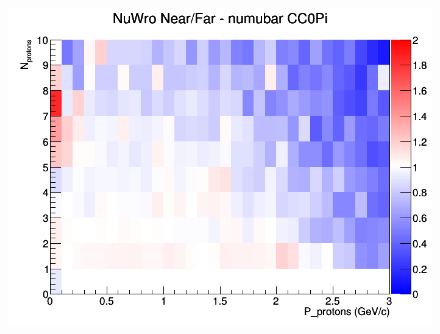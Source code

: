 \begin{figure}[h]
\endminipage
{}
\includegraphics[width=\linewidth]{N_P/nominal/protons/ratios/CC0Pi_NuWro_numubar_NF_N_P.png}
\endminipage
\newline
\end{figure}
\clearpage
